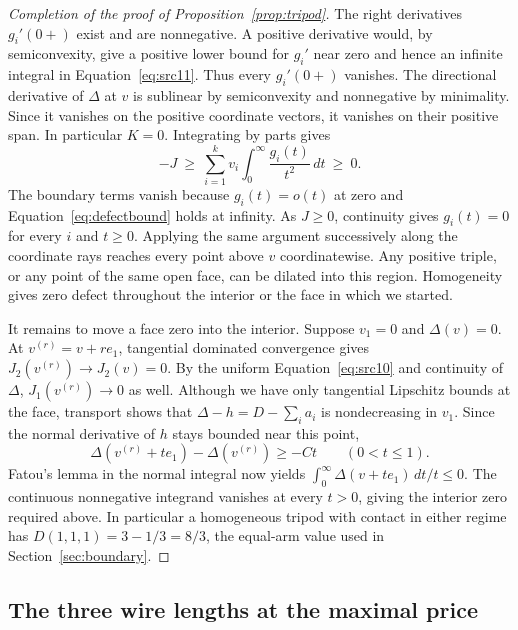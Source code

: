 \begin{proof}[Completion of the proof of Proposition~\ref{prop:tripod}]
The right derivatives $g_i'(0+)$ exist and are nonnegative. A
positive derivative would, by semiconvexity, give a positive lower
bound for $g_i'$ near zero and hence an infinite integral in
Equation~\eqref{eq:src11}. Thus every $g_i'(0+)$ vanishes. The
directional derivative of $\Delta$ at $v$ is sublinear by
semiconvexity and nonnegative by minimality. Since it vanishes on
the positive coordinate vectors, it vanishes on their positive span.
In particular $K=0$. Integrating by parts gives
\[
       -J\ \ge\ \sum_{i=1}^k v_i
                    \int_0^\infty\frac{g_i(t)}{t^2}\,dt\ \ge\ 0.
\]
The boundary terms vanish because $g_i(t)=o(t)$ at zero and
Equation~\eqref{eq:defectbound} holds at infinity. As $J\ge0$,
continuity gives $g_i(t)=0$ for every $i$ and $t\ge0$. Applying
the same argument successively along the coordinate rays reaches
every point above $v$ coordinatewise. Any positive triple, or any
point of the same open face, can be dilated into this region.
Homogeneity gives zero defect throughout the interior or the face
in which we started.

It remains to move a face zero into the interior. Suppose $v_1=0$
and $\Delta(v)=0$. At $v^{(r)}=v+re_1$, tangential dominated
convergence gives $J_2(v^{(r)})\to J_2(v)=0$. By the uniform
Equation~\eqref{eq:src10} and continuity of $\Delta$,
$J_1(v^{(r)})\to0$ as well. Although we have only tangential
Lipschitz bounds at the face, transport shows that
$\Delta-h=D-\sum_i a_i$ is nondecreasing in $v_1$. Since the normal
derivative of $h$ stays bounded near this point,
\[
 \Delta(v^{(r)}+te_1)-\Delta(v^{(r)})\ge-Ct \qquad(0<t\le1).
\]
Fatou's lemma in the normal integral now yields
$\int_0^\infty\Delta(v+te_1)\,dt/t\le0$. The continuous nonnegative
integrand vanishes at every $t>0$, giving the interior zero required
above. In particular a homogeneous tripod with contact in either
regime has $D(1,1,1)=3-1/3=8/3$, the equal-arm value used in
Section~\ref{sec:boundary}.
\end{proof}

\subsection{The three wire lengths at the maximal price}

